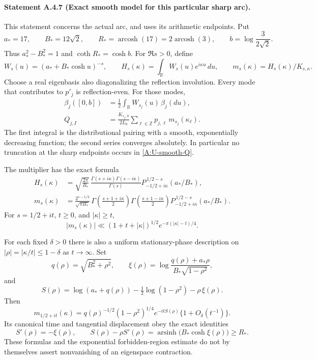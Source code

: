\paragraph{Statement A.4.7 (Exact smooth model for this particular sharp arc).}
This statement concerns the actual arc, and uses its arithmetic endpoints.
Put
\[
 a_*=17,\qquad B_*=12\sqrt2,\qquad
 R_*=\operatorname{arcosh}(17)=2\operatorname{arcosh}(3),
 \qquad b=\log\frac3{2\sqrt2}.
\]
Thus $a_*^2-B_*^2=1$ and $\coth R_*=\cosh b$.
For $\Re s>0$, define
\[
 W_s(u)=(a_*+B_*\cosh u)^{-s},\qquad
 H_s(\kappa)=\int_{\mathbb R}W_s(u)e^{i\kappa u}\,du,
 \qquad m_s(\kappa)=H_s(\kappa)/K_{s,\kappa}.
\]
Choose a real eigenbasis also diagonalizing the reflection involution.
Every mode that contributes to $p'_j$ is reflection-even. For those modes,
\begin{align}\label{A:U-smooth-boundary}
 \beta_j([0,b])
 &=\frac12\int_{\mathbb R}W_{s_j}(u)\,\beta_j(du),\\
 Q_{j,I}
 &=\frac{K_{s_j,0}}{2L_0}
       \sum_{\ell\in\mathbb Z}p_{j,\ell}\,
                    m_{s_j}(\kappa_\ell).
 \label{A:U-smooth-Q}
\end{align}
The first integral is the distributional pairing with a smooth,
exponentially decreasing function; the second series converges absolutely.
In particular no truncation at the sharp endpoints occurs in
\eqref{A:U-smooth-Q}.

The multiplier has the exact formula
\begin{align}\label{A:U-Legendre-multiplier}
 H_s(\kappa)
 &=\sqrt{\frac{2\pi}{B_*}}\,
   \frac{\Gamma(s+i\kappa)\Gamma(s-i\kappa)}{\Gamma(s)}
   P_{-1/2+i\kappa}^{\,1/2-s}(a_*/B_*),\\
 m_s(\kappa)
 &=\frac{2^{s-1/2}}{\sqrt{\pi B_*}}\,
   \Gamma\!\left(\frac{s+1+i\kappa}{2}\right)
   \Gamma\!\left(\frac{s+1-i\kappa}{2}\right)
   P_{-1/2+i\kappa}^{\,1/2-s}(a_*/B_*).
 \nonumber
\end{align}
For $s=1/2+it$, $t\geq0$, and $|\kappa|\geq t$,
\begin{equation}\label{A:U-forbidden-exponential}
 |m_s(\kappa)|\ll
 (1+t+|\kappa|)^{1/2}
       e^{-\pi(|\kappa|-t)/4}.
\end{equation}

For each fixed $\delta>0$ there is also a uniform stationary-phase
description on $|\rho|=|\kappa/t|\leq1-\delta$ as $t\to\infty$.
Set
\[
 q(\rho)=\sqrt{B_*^2+\rho^2},\qquad
 \xi(\rho)=
 \log\frac{q(\rho)+a_*\rho}{B_*\sqrt{1-\rho^2}},
\]
and
\[
 S(\rho)=\log(a_*+q(\rho))
       -\tfrac12\log(1-\rho^2)-\rho\,\xi(\rho).
\]
Then
\begin{equation}\label{A:U-stationary-multiplier}
 m_{1/2+it}(\kappa)
 =q(\rho)^{-1/2}(1-\rho^2)^{1/4}
       e^{-itS(\rho)}\{1+O_\delta(t^{-1})\}.
\end{equation}
Its canonical time and tangential displacement obey the exact identities
\begin{equation}\label{A:U-canonical-time}
 S'(\rho)=-\xi(\rho),\qquad
 S(\rho)-\rho S'(\rho)
   =\operatorname{arsinh}\!\bigl(B_*\cosh\xi(\rho)\bigr)
   \geq R_*.
\end{equation}
These formulas and the exponential forbidden-region estimate do not by
themselves assert nonvanishing of an eigenspace contraction.

